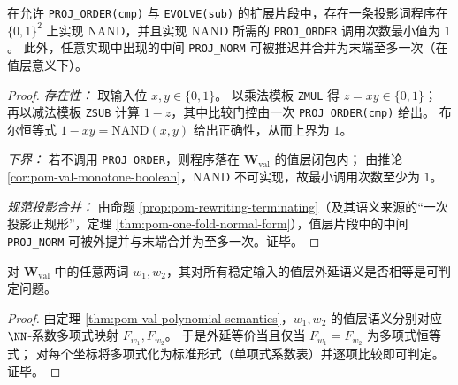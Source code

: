 \begin{proposition}\label{prop:pom-nand-projorder-budget-one}
在允许 \texttt{PROJ\_ORDER(cmp)} 与 \texttt{EVOLVE(sub)} 的扩展片段中，存在一条投影词程序在 \(\{0,1\}^2\) 上实现 \(\mathrm{NAND}\)，并且实现 \(\mathrm{NAND}\) 所需的 \texttt{PROJ\_ORDER} 调用次数最小值为 \(1\)。
此外，任意实现中出现的中间 \texttt{PROJ\_NORM} 可被推迟并合并为末端至多一次（在值层意义下）。
\end{proposition}
\begin{proof}
\emph{存在性：}
取输入位 \(x,y\in\{0,1\}\)。
以乘法模板 \texttt{ZMUL} 得 \(z=xy\in\{0,1\}\)；
再以减法模板 \texttt{ZSUB} 计算 \(1-z\)，其中比较门控由一次 \texttt{PROJ\_ORDER(cmp)} 给出。
布尔恒等式 \(1-xy=\mathrm{NAND}(x,y)\) 给出正确性，从而上界为 \(1\)。
\par
\emph{下界：}
若不调用 \texttt{PROJ\_ORDER}，则程序落在 \(\mathbf{W}_{\mathrm{val}}\) 的值层闭包内；
由推论 \ref{cor:pom-val-monotone-boolean}，\(\mathrm{NAND}\) 不可实现，故最小调用次数至少为 \(1\)。
\par
\emph{规范投影合并：}
由命题 \ref{prop:pom-rewriting-terminating}（及其语义来源的“一次投影正规形”，定理 \ref{thm:pom-one-fold-normal-form}），值层片段中的中间 \texttt{PROJ\_NORM} 可被外提并与末端合并为至多一次。证毕。
\end{proof}

\begin{theorem}[值层外延等价的可判定性]\label{thm:pom-val-extensional-equivalence-decidable}
对 \(\mathbf{W}_{\mathrm{val}}\) 中的任意两词 \(w_1,w_2\)，其对所有稳定输入的值层外延语义是否相等是可判定问题。
\end{theorem}
\begin{proof}
由定理 \ref{thm:pom-val-polynomial-semantics}，\(w_1,w_2\) 的值层语义分别对应 \(\NN\)-系数多项式映射 \(F_{w_1},F_{w_2}\)。
于是外延等价当且仅当 \(F_{w_1}=F_{w_2}\) 为多项式恒等式；
对每个坐标将多项式化为标准形式（单项式系数表）并逐项比较即可判定。证毕。
\end{proof}

